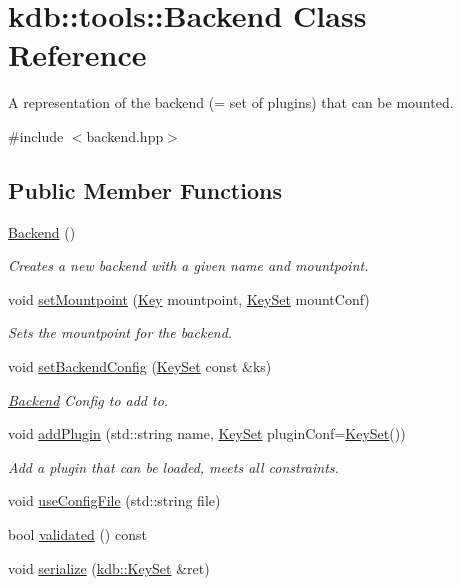 \hypertarget{classkdb_1_1tools_1_1Backend}{\section{kdb\-:\-:tools\-:\-:Backend Class Reference}
\label{classkdb_1_1tools_1_1Backend}
}


A representation of the backend (= set of plugins) that can be mounted.  




{\ttfamily \#include $<$backend.\-hpp$>$}

\subsection*{Public Member Functions}
\begin{DoxyCompactItemize}
\item 
\hyperlink{classkdb_1_1tools_1_1Backend_a1650b149ebf313ee8cd3472247212263}{Backend} ()
\begin{DoxyCompactList}\small\item\em Creates a new backend with a given name and mountpoint. \end{DoxyCompactList}\item 
void \hyperlink{classkdb_1_1tools_1_1Backend_ac61b2628800a6fd0a6620ff47bfb3be9}{set\-Mountpoint} (\hyperlink{classkdb_1_1Key}{Key} mountpoint, \hyperlink{classkdb_1_1KeySet}{Key\-Set} mount\-Conf)
\begin{DoxyCompactList}\small\item\em Sets the mountpoint for the backend. \end{DoxyCompactList}\item 
void \hyperlink{classkdb_1_1tools_1_1Backend_aa7aa17a1c97cdfa48bcebadb7bc00247}{set\-Backend\-Config} (\hyperlink{classkdb_1_1KeySet}{Key\-Set} const \&ks)
\begin{DoxyCompactList}\small\item\em \hyperlink{classkdb_1_1tools_1_1Backend}{Backend} Config to add to. \end{DoxyCompactList}\item 
void \hyperlink{classkdb_1_1tools_1_1Backend_ab9926bd1bbbc095b09a0a6666058cd05}{add\-Plugin} (std\-::string name, \hyperlink{classkdb_1_1KeySet}{Key\-Set} plugin\-Conf=\hyperlink{classkdb_1_1KeySet}{Key\-Set}())
\begin{DoxyCompactList}\small\item\em Add a plugin that can be loaded, meets all constraints. \end{DoxyCompactList}\item 
void \hyperlink{classkdb_1_1tools_1_1Backend_a5c72747e5419d7802849cfc2eb4064d2}{use\-Config\-File} (std\-::string file)
\item 
bool \hyperlink{classkdb_1_1tools_1_1Backend_ad2b145e2ac9a4f276714d0d982583e03}{validated} () const 
\item 
void \hyperlink{classkdb_1_1tools_1_1Backend_a93638ae12d8880bdb528ae709c857be7}{serialize} (\hyperlink{classkdb_1_1KeySet}{kdb\-::\-Key\-Set} \&ret)
\end{DoxyCompactItemize}


